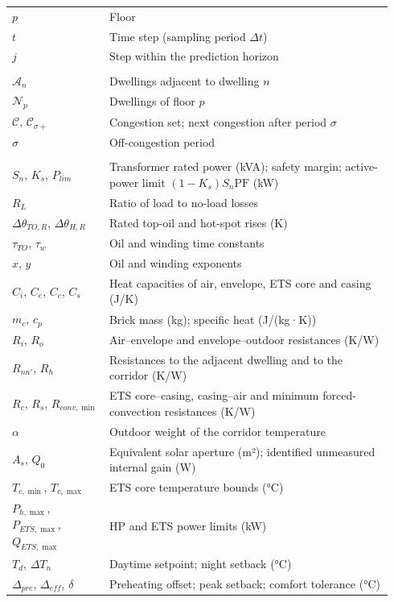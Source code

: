 \documentclass[10pt,letterpaper]{article}
\begin{document}
{\begin{longtable}{@{}>{\raggedright\arraybackslash}p{0.24\linewidth}>{\raggedright\arraybackslash}p{0.70\linewidth}@{}}
$p$ & Floor \\
$t$ & Time step (sampling period $\Delta t$) \\
$j$ & Step within the prediction horizon \\[4pt]
\multicolumn{2}{@{}l}{\textbf{Sets}}\\
$\mathcal A_n$ & Dwellings adjacent to dwelling $n$ \\
$\mathcal N_p$ & Dwellings of floor $p$ \\
$\mathcal C$, $\mathcal C_{\sigma+}$ & Congestion set; next congestion after period $\sigma$ \\
$\sigma$ & Off-congestion period \\[4pt]
\multicolumn{2}{@{}l}{\textbf{Parameters}}\\
$S_n$, $K_s$, $P_{lim}$ & Transformer rated power (kVA); safety margin; active-power limit $(1-K_s)S_n\mathrm{PF}$ (kW) \\
$R_L$ & Ratio of load to no-load losses \\
$\Delta\theta_{TO,R}$, $\Delta\theta_{H,R}$ & Rated top-oil and hot-spot rises (K) \\
$\tau_{TO}$, $\tau_w$ & Oil and winding time constants \\
$x$, $y$ & Oil and winding exponents \\
$C_i$, $C_e$, $C_c$, $C_s$ & Heat capacities of air, envelope, ETS core and casing (J/K) \\
$m_c$, $c_p$ & Brick mass (kg); specific heat (J/(kg·K)) \\
$R_i$, $R_o$ & Air--envelope and envelope--outdoor resistances (K/W) \\
$R_{nn'}$, $R_h$ & Resistances to the adjacent dwelling and to the corridor (K/W) \\
$R_c$, $R_s$, $R_{conv,\min}$ & ETS core--casing, casing--air and minimum forced-convection resistances (K/W) \\
$\alpha$ & Outdoor weight of the corridor temperature \\
$A_s$, $Q_0$ & Equivalent solar aperture (m²); identified unmeasured internal gain (W) \\
$T_{c,\min}$, $T_{c,\max}$ & ETS core temperature bounds (°C) \\
$P_{h,\max}$, $P_{ETS,\max}$, $Q_{ETS,\max}$ & HP and ETS power limits (kW) \\
$T_d$, $\Delta T_n$ & Daytime setpoint; night setback (°C) \\
$\Delta_{pre}$, $\Delta_{eff}$, $\delta$ & Preheating offset; peak setback; comfort tolerance (°C) \\

\end{longtable}}
\end{document}
